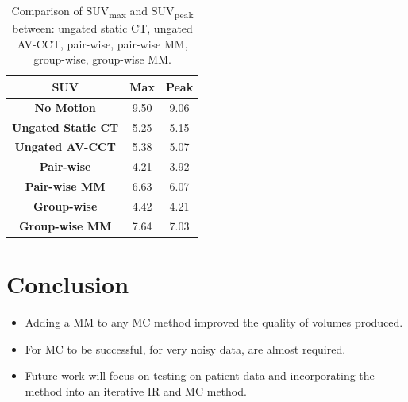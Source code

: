 \documentclass[misc, color=UCLburgundy, margin=1cm]{uclposter}
\DeclareRobustCommand{\glss}[1]
{%
  \ifglsused{#1}{\glsshorts{#1}}{\glslongs{#1} (\glsshorts{#1})\glsunset{#1}}%
}
\begin{document}
\begin{multicols}{4}
            \begin{table}[H]
                \centering
                \begin{highlightbox}[UCLlightblue]
                    \captionsetup{singlelinecheck=false, justification=centering}
                    \caption{Comparison of \gls{SUV}\textsubscript{max} and \gls{SUV}\textsubscript{peak} between: ungated static \gls{CT}, ungated \gls{AV-CCT}, pair-wise, pair-wise \gls{MM}, group-wise, group-wise \gls{MM}.}
                \end{highlightbox}
                \vspace{1.0cm}
                \resizebox*{0.75\linewidth}{!}
                {
                    \begin{tabular}{||c|cc||}
                        \hline
                        \textbf{\gls{SUV}}                  & \textbf{Max}  & \textbf{Peak} \\
                        \hline
                        \textbf{No Motion}                  & 9.50        & 9.06 \\
                        \hline
                        \textbf{Ungated Static \gls{CT}}    & 5.25        & 5.15 \\
                        \textbf{Ungated \gls{AV-CCT}}       & 5.38        & 5.07 \\
                        \hline
                        \textbf{Pair-wise}                  & 4.21        & 3.92 \\
                        \textbf{Pair-wise \gls{MM}}         & 6.63        & 6.07 \\
                        \hline
                        \textbf{Group-wise}                 & 4.42        & 4.21 \\
                        \textbf{Group-wise \gls{MM}}        & 7.64        & 7.03 \\
                        \hline
                    \end{tabular}
                }
            \end{table}
        
        \section*{Conclusion}
            \begin{itemize}
                \item Adding a \gls{MM} to any \gls{MC} method improved the quality of volumes produced.
                \item For \gls{MC} to be successful, for very noisy data, \glss{MM} are almost required.
                \item Future work will focus on testing on patient data and incorporating the method into an iterative \acrlong{IR} and \gls{MC} method.
            \end{itemize}
        

\end{multicols}
\end{document}
